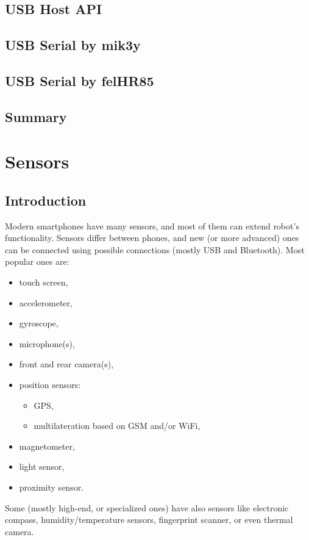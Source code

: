 \documentclass[openany]{mgr} %
\begin{document}
\section{USB Host API}



\section{USB Serial by mik3y}



\section{USB Serial by felHR85}




\section{Summary}

\chapter{Sensors}

\section{Introduction}
Modern smartphones have many sensors, and most of them can extend robot's
functionality. Sensors differ between phones, and new (or more advanced) ones can
be connected using possible connections (mostly USB and Bluetooth).
Most popular ones are:
\begin{itemize}
  \item touch screen,
  \item accelerometer,
  \item gyroscope,
  \item microphone(s),
  \item front and rear camera(s),
  \item position sensors:
  \begin{itemize}
    \item GPS,
    \item multilateration based on GSM and/or WiFi,
  \end{itemize}
  \item magnetometer,
  \item light sensor,
  \item proximity sensor.
\end{itemize}
Some (mostly high-end, or specialized ones) have also sensors like electronic
compass, humidity/temperature sensors, fingerprint scanner, or even thermal
camera.
\end{document}

